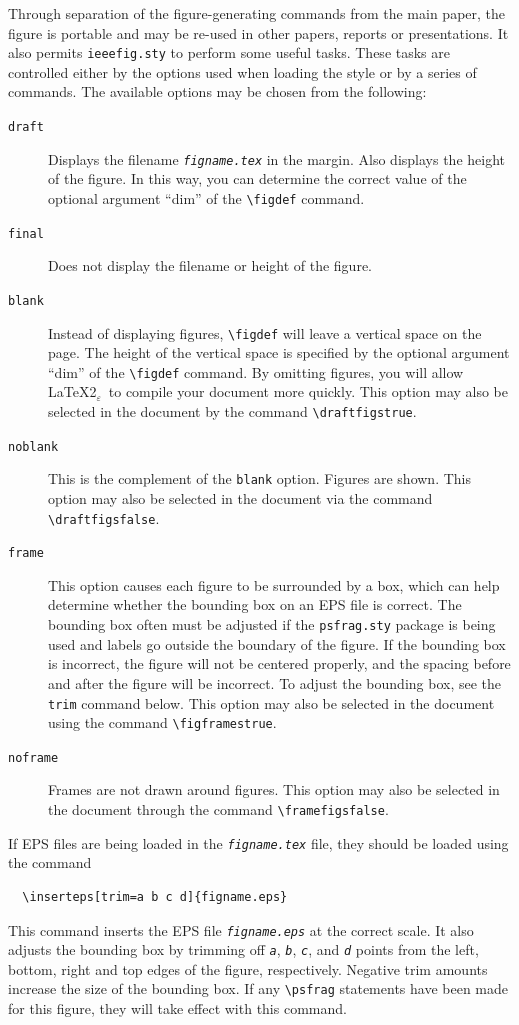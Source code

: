 \documentclass[%
	final,
	notitlepage,
	narroweqnarray,
	inline,
	twoside,
	]{ieee}
\newcommand{\latexiie}{\LaTeX2{\Large$_\varepsilon$}}
\begin{document}
Through separation of the figure-generating commands from the main
paper, the figure is portable and may be re-used in other papers,
reports or presentations. It also permits \texttt{ieeefig.sty} to
perform some useful tasks. These tasks are controlled either by the
options used when loading the style or by a series of commands. The
available options may be chosen from the following:
\begin{description}
\item[\texttt{draft}] Displays the filename \texttt{\emph{figname.tex\/}} in the
    margin. Also displays the height of the figure. In this way, you can
    determine the correct value of the optional argument ``dim'' of the 
    \verb|\figdef| command.
\item[\texttt{final}] Does not display the filename or height of the figure.
\item[\texttt{blank}] Instead of displaying figures, 
    \verb|\figdef| will leave a vertical space on the page.  The height of 
    the vertical space is specified by the optional argument ``dim'' of the 
    \verb|\figdef| command. By omitting figures, you will
    allow 
    \latexiie\ to compile your document more quickly. This option may also 
    be selected in the document by the command \verb|\draftfigstrue|.
\item[\texttt{noblank}] This is the complement of the 
    \texttt{blank} option. Figures are shown. This option may also be
    selected in the document via the command \verb|\draftfigsfalse|.
\item[\texttt{frame}] This option causes each figure to be surrounded
    by a box, which can help determine whether the bounding box 
    on an EPS file is correct. The bounding box often must be adjusted if the
    \texttt{psfrag.sty} package is being used and labels go outside the 
    boundary of the figure. If the bounding box is incorrect, the figure
    will not be centered properly, and the spacing before and after the 
    figure will be incorrect. To adjust the bounding box, see the
    \texttt{trim} command below. This option may also be selected in the
    document using the command \verb|\figframestrue|.
\item[\texttt{noframe}] Frames are not drawn around figures. This option
    may also be selected in the document through the command
    \verb|\framefigsfalse|.
\end{description}

If EPS files are being loaded in the \texttt{\emph{figname.tex\/}} file, they
should be loaded using the command
\begin{verbatim}
  \inserteps[trim=a b c d]{figname.eps}
\end{verbatim}
This command inserts the EPS file \texttt{\emph{figname.eps}} at the correct
scale. It also adjusts the bounding box by trimming off \texttt{\emph{a}}, 
\texttt{\emph{b}}, \texttt{\emph{c}}, and \texttt{\emph{d}} points from 
the left, bottom, right and top
edges of the figure, respectively. Negative trim amounts increase the
size of the bounding box. If any \verb|\psfrag| statements have been
made for this figure, they will take effect with this command.
\end{document}
